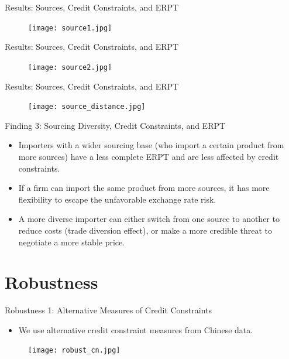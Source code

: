 \documentclass[10pt]{beamer}
\begin{document}
\begin{frame}{Results: Sources, Credit Constraints, and ERPT}
	\begin{figure}[htbp]
		\centering
		\texttt{[image: source1.jpg]}
		\label{source1}
	\end{figure}
\end{frame}

\begin{frame}{Results: Sources, Credit Constraints, and ERPT}
	\begin{figure}[htbp]
		\centering
		\texttt{[image: source2.jpg]}
		\label{source2}
	\end{figure}
\end{frame}

\begin{frame}{Results: Sources, Credit Constraints, and ERPT}
	\begin{figure}[htbp]
		\centering
		\texttt{[image: source\_distance.jpg]}
		\label{source.distance}
	\end{figure}
\end{frame}

\begin{frame}{Finding 3: Sourcing Diversity, Credit Constraints, and ERPT}
	\begin{tcolorbox}[colback=blue!5!white, colframe=blue!75!black,title=Key Finding 3]
		\begin{itemize}
			\item Importers with a wider sourcing base (who import a certain product from more sources) have a less complete ERPT and are less affected by credit constraints.
		\end{itemize}
	\end{tcolorbox}
	\begin{itemize}
		\item If a firm can import the same product from more sources, it has more flexibility to escape the unfavorable exchange rate risk.
		\item A more diverse importer can either switch from one source to another to reduce costs (trade diversion effect), or make a more credible threat to negotiate a more stable price.
	\end{itemize}
\end{frame}

\section{Robustness}

\begin{frame}{Robustness 1: Alternative Measures of Credit Constraints}
	\begin{itemize}
		\item We use alternative credit constraint measures from Chinese data.
	\end{itemize}
	\begin{figure}[htbp]
		\centering
		\texttt{[image: robust\_cn.jpg]}
		\label{robust.cn}
	\end{figure}
\end{frame}
\end{document}
